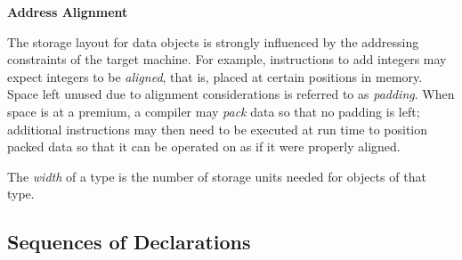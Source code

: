 \documentclass[12pt,a4paper,twoside,openany]{book}
\begin{document}
\begin{framed}
    \begin{center}
        \textbf{{\large Address Alignment}}
    \end{center}
    
    The storage layout for data objects is strongly influenced by the addressing constraints of the target machine. For example, instructions to add integers may expect integers to be \textit{aligned}, that is, placed at certain positions in memory. Space left unused due to alignment considerations is referred to as \textit{padding}. When space is at a premium, a compiler may \textit{pack} data so that no padding is left; additional instructions may then need to be executed at run time to position packed data so that it can be operated on as if it were properly aligned.
\end{framed}

The \textit{width} of a type is the number of storage units needed for objects of that type.

\subsection{Sequences of Declarations}

\end{document}
